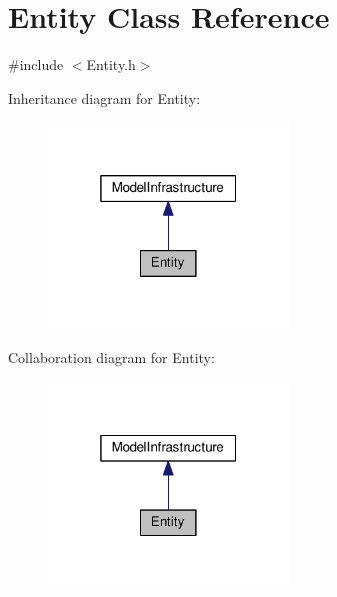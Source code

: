 \hypertarget{class_entity}{}\section{Entity Class Reference}
\label{class_entity}


{\ttfamily \#include $<$Entity.\+h$>$}



Inheritance diagram for Entity\+:
\nopagebreak
\begin{figure}[H]
\begin{center}
\leavevmode
\includegraphics[width=181pt]{class_entity__inherit__graph}
\end{center}
\end{figure}


Collaboration diagram for Entity\+:
\nopagebreak
\begin{figure}[H]
\begin{center}
\leavevmode
\includegraphics[width=181pt]{class_entity__coll__graph}
\end{center}
\end{figure}
